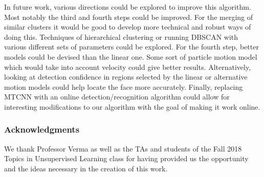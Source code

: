 \documentclass{article}
\begin{document}
In future work, various directions could be explored to improve this algorithm. Most notably the third and fourth steps could be improved. For the merging of similar clusters it would be good 
to develop more technical and robust ways of doing this. Techniques of hierarchical clustering or running DBSCAN with various different sets of parameters could be explored. For the fourth step, 
better models could be devised than the linear one. Some sort of particle motion model which would take into account velocity could give better results. Alternatively, looking at detection confidence in 
regions selected by the linear or alternative motion models could help locate the face more accurately. Finally, replacing MTCNN with an online detection/recognition algorithm could allow for interesting
modifications to our algorithm with the goal of making it work online.

\subsubsection*{Acknowledgments}

We thank Professor Verma as well as the TAs and students of the Fall 2018 Topics in Unsupervised Learning class for having provided us the opportunity 
and the ideas necessary in the creation of this work.

\newpage


\end{document}
